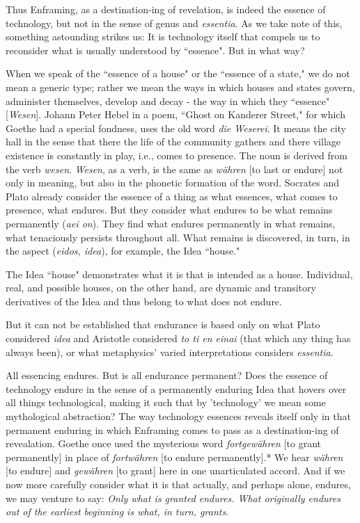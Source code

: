 \documentclass[12pt]{article}
\begin{document}
Thus Enframing, as a destination-ing of revelation, is indeed the essence of technology, but not in the sense of genus and \textit{essentia}. As we take note of this, something astounding strikes us: It is technology itself that compels us to reconsider what is usually understood by ``essence". But in what way?

When we speak of the ``essence of a house" or the ``essence of a state," we do not mean a generic type; rather we mean the ways in which houses and states govern, administer themselves, develop and decay - the way in which they ``essence" [\textit{Wesen}]. Johann Peter Hebel in a poem, ``Ghost on Kanderer Street," for which Goethe had a special fondness, uses the old word \textit{die Weserei}. It means the city hall in the sense that there the life of the community gathers and there village existence is constantly in play, i.e., comes to presence. The noun is derived from the verb \textit{wesen}. \textit{Wesen}, as a verb, is the same as \textit{w{\"a}hren} [to last or endure] not only in meaning, but also in the phonetic formation of the word. Socrates and Plato already consider the essence of a thing as what essences, what comes to presence, what endures. But they consider what endures to be what remains permanently (\textit{aei on}). They find what endures permanently in what remains, what tenaciously persists throughout all. What remains is discovered, in turn, in the aspect (\textit{eidos, idea}), for example, the Idea ``house."

The Idea ``house" demonstrates what it is that is intended as a house. Individual, real, and possible houses, on the other hand, are dynamic and transitory derivatives of the Idea and thus belong to what does not endure.

But it can not be established that endurance is based only on what Plato considered \textit{idea} and Aristotle considered \textit{to ti {\-e}n einai} (that which any thing has always been), or what metaphysics' varied interpretations considers \textit{essentia}.

All essencing endures. But is all endurance permanent? Does the essence of technology endure in the sense of a permanently enduring Idea that hovers over all things technological, making it such that by 'technology' we mean some mythological abstraction? The way technology essences reveals itself only in that permanent enduring in which Enframing comes to pass as a destination-ing of revealation. Goethe once used the mysterious word \textit{fortgew{\"a}hren} [to grant permanently] in place of \textit{fortw{\"a}hren} [to endure permanently].* We hear \textit{w{\"a}hren} [to endure] and \textit{gew{\"a}hren} [to grant] here in one unarticulated accord. And if we now more carefully consider what it is that actually, and perhaps alone, endures, we may venture to say: \textit{Only what is granted endures. What originally endures out of the earliest beginning is what, in turn, grants}. 
\end{document}
